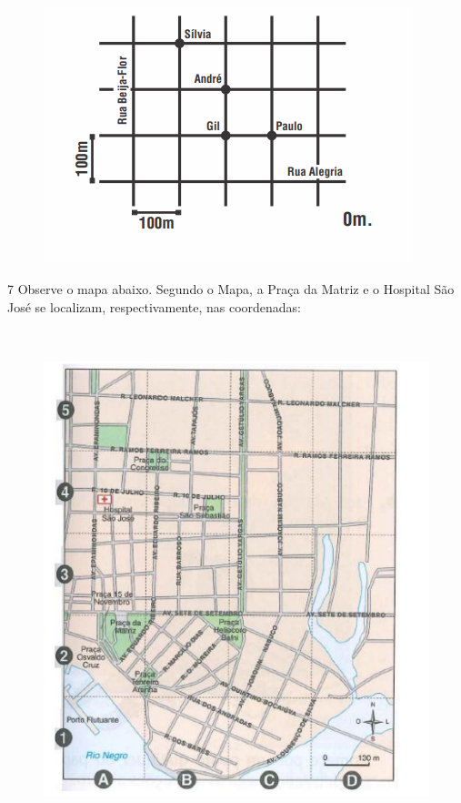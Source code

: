 {\begin{figure}
\includegraphics[width=4.19792in,height=2.93056in]{./imgSAEB_6_MAT/media/image69.png}
\end{figure}


\num{7}  Observe o mapa abaixo. Segundo o Mapa, a Praça da Matriz e o Hospital São José se localizam,
respectivamente, nas coordenadas:

\begin{figure}
\includegraphics[width=5.08333in,height=5.71875in]{./imgSAEB_6_MAT/media/image70.png}
\end{figure}

}
